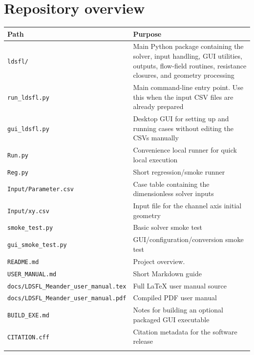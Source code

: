\documentclass[11pt,a4paper]{article}
\begin{document}
\section{Repository overview}
\label{RepositoryOverview}

\begin{longtable}{>{\small\ttfamily}p{} p{}}

\toprule
\textbf{Path} & \textbf{Purpose} \\
\midrule
\endhead
	\texttt{ldsfl/} & Main Python package containing the solver, input handling, GUI utilities, outputs, flow-field routines, resistance closures, and geometry processing \\
	\texttt{run\_ldsfl.py} & Main command-line entry point. Use this when the input CSV files are already prepared \\
	\texttt{gui\_ldsfl.py} & Desktop GUI for setting up and running cases without editing the CSVs manually \\
	\texttt{Run.py} & Convenience local runner for quick local execution \\
	\texttt{Reg.py} & Short regression/smoke runner \\
	\texttt{Input/Parameter.csv} & Case table containing the dimensionless solver inputs \\
	\texttt{Input/xy.csv} & Input file for the channel axis initial geometry \\
	\texttt{smoke\_test.py} & Basic solver smoke test \\
	\texttt{gui\_smoke\_test.py} & GUI/configuration/conversion smoke test \\
	\texttt{README.md} & Project overview.\\
	\texttt{USER\_MANUAL.md} & Short Markdown guide \\
	\texttt{docs/LDSFL\_Meander\_user\_manual.tex} & Full LaTeX user manual source \\
	\texttt{docs/LDSFL\_Meander\_user\_manual.pdf} & Compiled PDF user manual \\
	\texttt{BUILD\_EXE.md} & Notes for building an optional packaged GUI executable \\
	\texttt{CITATION.cff} & Citation metadata for the software release \\
\bottomrule
\label{RepositoryTable}
\end{longtable}
\end{document}
